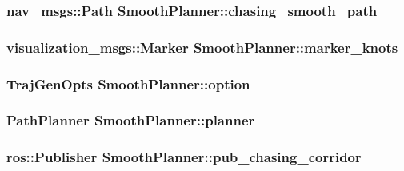 \subsubsection[{\texorpdfstring{chasing\+\_\+smooth\+\_\+path}{chasing_smooth_path}}]{\setlength{\rightskip}{0pt plus 5cm}nav\+\_\+msgs\+::\+Path Smooth\+Planner\+::chasing\+\_\+smooth\+\_\+path}\hypertarget{class_smooth_planner_a6a33038c6041ff972bea7765780b56d0}{}\label{class_smooth_planner_a6a33038c6041ff972bea7765780b56d0}
\subsubsection[{\texorpdfstring{marker\+\_\+knots}{marker_knots}}]{\setlength{\rightskip}{0pt plus 5cm}visualization\+\_\+msgs\+::\+Marker Smooth\+Planner\+::marker\+\_\+knots}\hypertarget{class_smooth_planner_afeeab9ce830d4960babdc84c82da94ea}{}\label{class_smooth_planner_afeeab9ce830d4960babdc84c82da94ea}
\subsubsection[{\texorpdfstring{option}{option}}]{\setlength{\rightskip}{0pt plus 5cm}Traj\+Gen\+Opts Smooth\+Planner\+::option}\hypertarget{class_smooth_planner_af0c954aea3c6b5b82a160ed4be93fb17}{}\label{class_smooth_planner_af0c954aea3c6b5b82a160ed4be93fb17}
\subsubsection[{\texorpdfstring{planner}{planner}}]{\setlength{\rightskip}{0pt plus 5cm}Path\+Planner Smooth\+Planner\+::planner}\hypertarget{class_smooth_planner_aa9df69d4f514c7338ab2d066d38dd1a2}{}\label{class_smooth_planner_aa9df69d4f514c7338ab2d066d38dd1a2}
\subsubsection[{\texorpdfstring{pub\+\_\+chasing\+\_\+corridor}{pub_chasing_corridor}}]{\setlength{\rightskip}{0pt plus 5cm}ros\+::\+Publisher Smooth\+Planner\+::pub\+\_\+chasing\+\_\+corridor}\hypertarget{class_smooth_planner_a7cd9de34963f445a21a6d0101346b071}{}\label{class_smooth_planner_a7cd9de34963f445a21a6d0101346b071}
